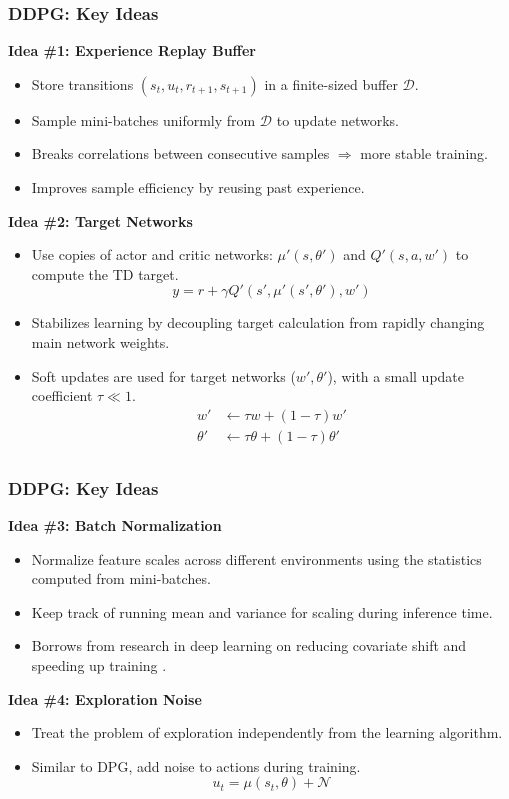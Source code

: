 \documentclass[9pt, aspectratio=169]{beamer}
\begin{document}
\begin{frame}
  \frametitle{DDPG: Key Ideas}
    \textbf{Idea \#1: Experience Replay Buffer}
    \begin{itemize}
        \item Store transitions $(s_t, u_t, r_{t+1}, s_{t+1})$ in a finite-sized buffer $\mathcal{D}$.
        \item Sample mini-batches uniformly from $\mathcal{D}$ to update networks.
        \item Breaks correlations between consecutive samples $\Rightarrow$ more stable training.
        \item Improves sample efficiency by reusing past experience.
    \end{itemize}
    \textbf{Idea \#2: Target Networks}
    \begin{itemize}
        \item Use copies of actor and critic networks: $\mu'(s, \theta')$ and $Q'(s, a, w')$ to compute the TD target.
          \begin{equation*}
          y = r + \gamma Q'(s', \mu'(s', \theta'), w')
          \end{equation*}
        \item Stabilizes learning by decoupling target calculation from rapidly changing main network weights.
        \item Soft updates are used for target networks ($w', \theta'$), with a small update coefficient $\tau \ll 1$.
        \begin{align*}
        w' &\leftarrow \tau w + (1-\tau) w' \\
        \theta' &\leftarrow \tau \theta + (1-\tau) \theta' \\
        \end{align*}
    \end{itemize}
\end{frame}

\begin{frame}
  \frametitle{DDPG: Key Ideas}
    \textbf{Idea \#3: Batch Normalization}
    \begin{itemize}
        \item Normalize feature scales across different environments using the statistics computed from mini-batches.
        \item Keep track of running mean and variance for scaling during inference time.
        \item Borrows from research in deep learning on reducing covariate shift and speeding up training \cite{ioffe2015batchnormalizationacceleratingdeep}.
    \end{itemize}
    \textbf{Idea \#4: Exploration Noise}
    \begin{itemize}
        \item Treat the problem of exploration independently from the learning algorithm.
        \item Similar to DPG, add noise to actions during training.
        $$u_t = \mu(s_t, \theta) + \mathcal{N}$$
    \end{itemize}
\end{frame}
\end{document}
